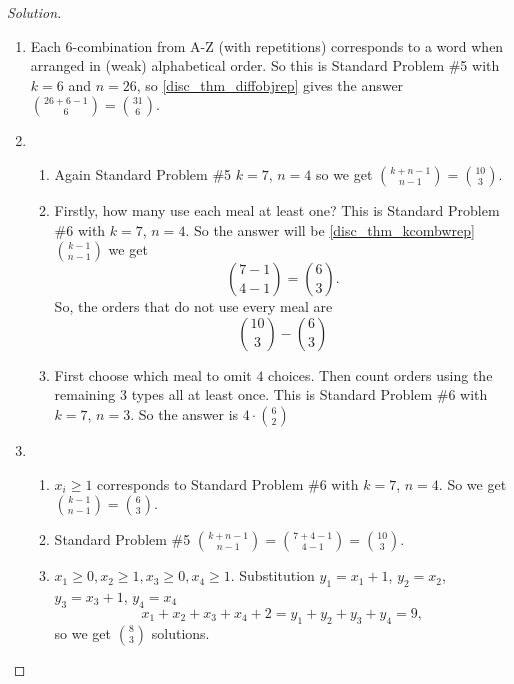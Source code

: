 \documentclass[10pt, a4paper]{article}
\begin{document}
\begin{example}
    \begin{proof}[Solution]\renewcommand{\qedsymbol}{}
    \begin{enumerate}[label = E\arabic*]
        \item Each $6$-combination from A-Z (with repetitions) corresponds to a word when arranged in (weak) alphabetical order.
        So this is Standard Problem \#5 with $k = 6$ and $n = 26$,
        so \autoref{disc_thm_diffobjrep} gives the answer $\binom{26 + 6 - 1}{6} = \binom{31}{6}$.
        \item
        \begin{enumerate}[label = (\alph*)]
            \item Again Standard Problem \#5 $k = 7$, $n = 4$
            so we get $\binom{k + n - 1}{n - 1} = \binom{10}{3}$.
            \item Firstly, how many use each meal at least one?
            This is Standard Problem \#6 with $k = 7$, $n = 4$.
            So the answer will be \autoref{disc_thm_kcombwrep} $\binom{k - 1}{n - 1}$ we get
            \[
            \binom{7 - 1}{4 - 1} = \binom{6}{3}.
            \]
            So, the orders that do not use every meal are
            \[
            \binom{10}{3} - \binom{6}{3}
            \]
            \item First choose which meal to omit $4$ choices.
            Then count orders using the remaining $3$ types all at least once.
            This is Standard Problem \#6 with $k = 7$, $n = 3$.
            So the answer is $4 \cdot \binom{6}{2}$
        \end{enumerate}
        \item 
        \begin{enumerate}[label = (\alph*)]
            \item $x_i \geq 1$ corresponds to Standard Problem \#6 with $k = 7$, $n = 4$.
            So we get $\binom{k - 1}{n - 1} = \binom{6}{3}$.
            \item Standard Problem \#5 $\binom{k + n - 1}{n - 1} = \binom{7 + 4 - 1}{4 - 1} = \binom{10}{3}$.
            \item $x_1 \geq 0, x_2 \geq 1, x_3 \geq 0, x_4 \geq 1$. Substitution $y_1 = x_1 + 1$, $y_2 = x_2$, $y_3 = x_3 + 1$, $y_4 = x_4$
            \[
            x_1 + x_2 + x_3 + x_4 + 2 = y_1 + y_2 + y_3 + y_4 = 9,
            \]
            so we get $\binom{8}{3}$ solutions.
        \end{enumerate}
    \end{enumerate}
    \end{proof}
\end{example}
\end{document}

